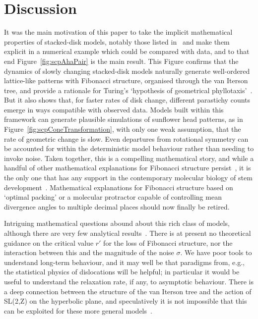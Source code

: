\documentclass[a4paper,10pt]{amsart}
\begin{document}
\section{Discussion}
It was the main motivation of this paper to take the implicit mathematical properties of stacked-disk models, notably those listed in~\cite{goleFibonacciQuasisymmetricPhyllotaxis2016} and make them explicit in a numerical example which could be compared with data, and to that end Figure~\ref{fig:scpAhaPair} is the main result. This Figure confirms that the dynamics of slowly changing stacked-disk models naturally generate well-ordered lattice-like patterns with Fibonacci structure, organised through the van Iterson tree, and provide a rationale for Turing's `hypothesis of geometrical phyllotaxis'~\cite{turingMorphogenTheoryPhyllotaxis2013,swintonMathematicalPhyllotaxis2023}. But it also shows that, for faster rates of disk change, different parastichy counts emerge in ways compatible with observed data.  Models built within this framework can generate plausible simulations of sunflower head patterns, as in Figure~\ref{fig:scpConeTransformation}, with  only one weak assumption, that the rate of geometric change is slow.  Even departures from rotational symmetry can be accounted for within the deterministic model behaviour rather than needing to invoke noise.
Taken together, this is a compelling mathematical story, and while a handful of other mathematical explanations for Fibonacci structure persist~\cite{okabeUnifiedRulePhyllotaxis2019}, it is the only one that has any support in the contemporary molecular biology of stem development~\cite{swintonMathematicalPhyllotaxis2023}. Mathematical explanations for Fibonacci structure based on `optimal packing' or a molecular protractor capable of controlling mean divergence angles to multiple decimal places should now finally be retired.



Intriguing mathematical questions abound about this rich class of models, although there are very few analytical results~\cite{goleConvergenceDiskStacking2020}. There is at present no theoretical guidance on the critical value $r'$ for the loss of Fibonacci structure, nor the interaction between this and the magnitude of the noise $\sigma$.  We have poor tools to understand  long-term behaviour, and it may well be that paradigms from, e.g., the statistical physics of dislocations will be helpful; in  particular it would be useful to understand the relaxation rate, if any, to asymptotic behaviour.  There is a deep connection between the structure of the van Iterson tree and the action of SL(2,Z) on the hyperbolic plane, and speculatively it is not impossible that this can be exploited for these more general models~\cite{swintonMathematicalPhyllotaxis2023}.  
\end{document}
